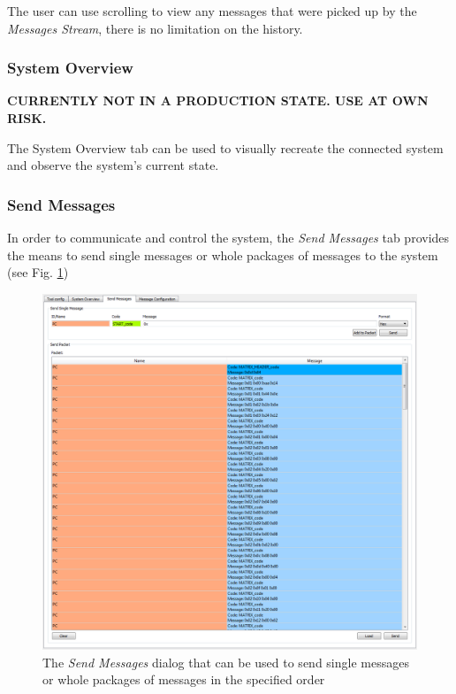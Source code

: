 \documentclass[12pt,a4paper]{scrartcl}
\begin{document}
The user can use scrolling to view any messages that were picked up by the \textit{Messages Stream}, there is no limitation on the history.

\subsubsection{System Overview}
\label{subsubsec:GettingStartedOverviewSysOverview}
\textbf{CURRENTLY NOT IN A PRODUCTION STATE. USE AT OWN RISK.}

The System Overview tab can be used to visually recreate the connected system and observe the system's current state.

\subsubsection{Send Messages}
\label{subsubsec:GettingStartedOverviewSendMsgs}
In order to communicate and control the system, the \textit{Send Messages} tab provides the means to send single messages or whole packages of messages to the system (see Fig. \ref{fig:SendMessagesOvrv})

\begin{figure}
	\centering
	\includegraphics[width=\linewidth,keepaspectratio]{Graphics/SendMessagesOverview}
	\caption[Send Messages Dialog]{The \textit{Send Messages} dialog that can be used to send single messages or whole packages of messages in the specified order}
	\label{fig:SendMessagesOvrv}
\end{figure}
\end{document}
